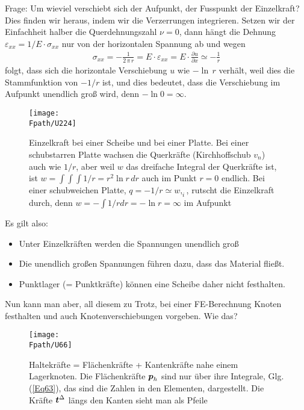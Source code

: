 {{Frage: Um wieviel verschiebt sich der Aufpunkt, der Fusspunkt der Einzelkraft? Dies finden wir heraus, indem wir die Verzerrungen integrieren. Setzen wir der Einfachheit halber die Querdehnungszahl $\nu = 0$, dann h\"{a}ngt die Dehnung $\varepsilon_{xx} = 1/E\cdot\sigma_{xx}$ nur von der horizontalen Spannung ab und wegen
\begin{align}
\sigma_{xx} =  -\frac{1}{2\,\pi\,r} =  E \cdot \varepsilon_{xx} =  E \cdot \frac{\partial u}{\partial x} \simeq -\frac{1}{r}
\end{align}
folgt, dass sich die horizontale Verschiebung $u $ wie $- \ln\,r$ verh\"{a}lt, weil dies die Stammfunktion von $-1/r$ ist, und dies bedeutet, dass die Verschiebung im Aufpunkt unendlich gro{\ss} wird, denn $-\ln 0 = \infty$.

\begin{figure}
\centering
\texttt{[image: \\Fpath/U224]}
\caption{Einzelkraft bei einer Scheibe und bei einer Platte. Bei einer schubstarren Platte wachsen die Querkr\"{a}fte (Kirchhoffschub $v_n$) auch wie $1/r$, aber weil $w$ das dreifache Integral der Querkr\"{a}fte ist, ist $w = \int\!\!\int\!\!\int 1/r = r^2\ln r\,dr$ auch im Punkt $r = 0$ endlich. Bei einer schubweichen Platte, $q = -1/r  \simeq w,_i$, rutscht die Einzelkraft durch, denn $w = -\int 1/r dr = -\ln r = \infty$ im Aufpunkt }
\label{U224}%
\end{figure}%

Es gilt also:\\

\begin{itemize}
  \item Unter Einzelkr\"{a}ften werden die Spannungen unendlich gro{\ss}
  \item Die unendlich gro{\ss}en Spannungen f\"{u}hren dazu, dass das Material flie{\ss}t.
  \item Punktlager (= Punktkr\"{a}fte) k\"{o}nnen eine Scheibe daher nicht festhalten.
 \end{itemize}

Nun kann man aber, all diesem zu Trotz, bei einer FE-Berechnung Knoten festhalten und auch Knotenverschiebungen vorgeben. Wie das?
\begin{figure}
\centering
\if {} \sidecaption[t] \fi
{\texttt{[image: \\Fpath/U66]}}
\caption{Haltekr\"{a}fte = Fl\"{a}chenkr\"{a}fte + Kantenkr\"{a}fte nahe einem Lagerknoten. Die Fl\"{a}chenkr\"{a}fte $\mbox{\boldmath $p$}_h$ sind nur \"{u}ber ihre Integrale, Glg. (\ref{Eq63}), das sind die Zahlen in den Elementen, dargestellt. Die Kr\"{a}fte $\mbox{\boldmath $t$}^\Delta$ l\"{a}ngs den Kanten sieht man als Pfeile}
\label{U66}%
\end{figure}%

}}
